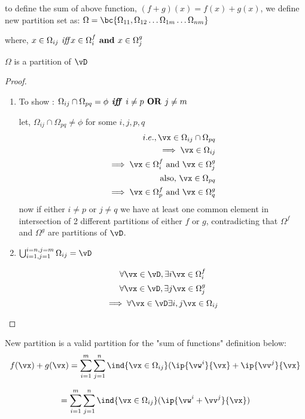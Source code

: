 \documentclass[a4paper,11pt]{article}
\begin{document}
\begin{mlsolution}
\begin{enumerate}
to define the sum of above function, $(f+g)(x) = f(x)+g(x)$, we define new partition set as:
$ \Omega  = \bc {\Omega_{11}, \Omega_{12} \ldots \Omega_{1m} \ldots \Omega_{nm}} $

where,
$x \in \Omega_{ij} \text {\textit{ iff}}  x \in \Omega_i^f  \textbf{ and } x \in \Omega_j^g$

\begin{claim}
$\Omega$ is a partition of $\vD$
\end{claim}
\begin{proof}
\begin{enumerate}

\item To show : $\Omega_{ij} \cap \Omega_{pq} = \phi \text{\textbf{\textit{ iff }}}  i \neq p \text{\textbf{ OR }} j \neq m $

let, $\Omega_{ij} \cap \Omega_{pq} \neq \phi$ for some $i,j,p,q$
\begin{align}
i.e., \vx \in \Omega_{ij} \cap \Omega_{pq}\\
\implies \vx \in \Omega_{ij}\\
\implies \vx \in \Omega_{i}^f \text{ and } \vx \in \Omega_{j}^g\\
\text{also, } \vx \in \Omega_{pq}\\
\implies \vx \in \Omega_{p}^f \text{ and } \vx \in \Omega_{q}^g
\end{align}
now if either $i \neq p$ or $j \neq q$ we have at least one common element in intersection of 2 different partitions of either $f$ or $g$, contradicting that $\Omega^f$ and $\Omega^g$ are partitions of $\vD$.

\item $\bigcup_{i=1, j=1}^{i=n, j=m} \Omega_{ij} = \vD$
\iffalse
To see that $\Omega$ spans whole $\vD$, notice that the construction is similar to getting all cartesian products of $\Omega^f$ and $\Omega^g$,
\fi

\[ \forall \vx \in \vD, \exists i \vx \in \Omega^f_i \]
\[ \forall \vx \in \vD, \exists j \vx \in \Omega^g_j \]
\[ \implies \forall \vx \in \vD \exists i,j \vx \in \Omega_{ij} \]
\end{enumerate}
\end{proof}
New partition is a valid partition for the "sum of functions" definition below:
\[ 
    f(\vx) + g(\vx) = \sum_{i=1}^{m} \sum_{j=1}^{n} \ind{\vx \in \Omega_{ij}} ( \ip{\vw^i}{\vx} + \ip{\vv^j}{\vx}
\]

\[ 
    = \sum_{i=1}^{m} \sum_{j=1}^{n} \ind{\vx \in \Omega_{ij}} ( \ip{\vw^i + \vv^j}{\vx} )
\]


\end{enumerate}
\end{mlsolution}
\end{document}
